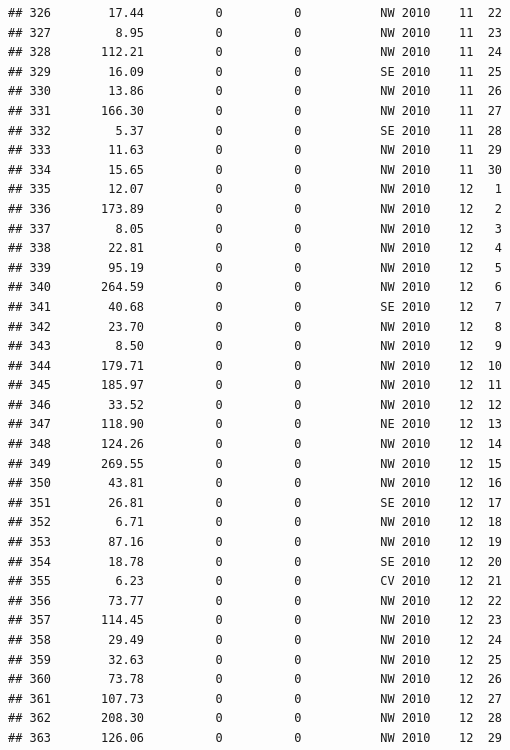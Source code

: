 \documentclass[
]{article}
\begin{document}
\begin{verbatim}
## 326        17.44          0          0           NW 2010    11  22
## 327         8.95          0          0           NW 2010    11  23
## 328       112.21          0          0           NW 2010    11  24
## 329        16.09          0          0           SE 2010    11  25
## 330        13.86          0          0           NW 2010    11  26
## 331       166.30          0          0           NW 2010    11  27
## 332         5.37          0          0           SE 2010    11  28
## 333        11.63          0          0           NW 2010    11  29
## 334        15.65          0          0           NW 2010    11  30
## 335        12.07          0          0           NW 2010    12   1
## 336       173.89          0          0           NW 2010    12   2
## 337         8.05          0          0           NW 2010    12   3
## 338        22.81          0          0           NW 2010    12   4
## 339        95.19          0          0           NW 2010    12   5
## 340       264.59          0          0           NW 2010    12   6
## 341        40.68          0          0           SE 2010    12   7
## 342        23.70          0          0           NW 2010    12   8
## 343         8.50          0          0           NW 2010    12   9
## 344       179.71          0          0           NW 2010    12  10
## 345       185.97          0          0           NW 2010    12  11
## 346        33.52          0          0           NW 2010    12  12
## 347       118.90          0          0           NE 2010    12  13
## 348       124.26          0          0           NW 2010    12  14
## 349       269.55          0          0           NW 2010    12  15
## 350        43.81          0          0           NW 2010    12  16
## 351        26.81          0          0           SE 2010    12  17
## 352         6.71          0          0           NW 2010    12  18
## 353        87.16          0          0           NW 2010    12  19
## 354        18.78          0          0           SE 2010    12  20
## 355         6.23          0          0           CV 2010    12  21
## 356        73.77          0          0           NW 2010    12  22
## 357       114.45          0          0           NW 2010    12  23
## 358        29.49          0          0           NW 2010    12  24
## 359        32.63          0          0           NW 2010    12  25
## 360        73.78          0          0           NW 2010    12  26
## 361       107.73          0          0           NW 2010    12  27
## 362       208.30          0          0           NW 2010    12  28
## 363       126.06          0          0           NW 2010    12  29

\end{verbatim}
\end{document}
